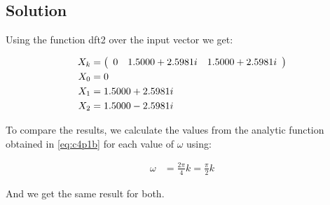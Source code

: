 \subsection*{Solution}

Using the function dft2 over the input vector we get:

\begin{equation*}
\begin{aligned}
X_k &= \left(
 \begin{array}{c c c}
 0 & 1.5000 + 2.5981i & 1.5000 + 2.5981i
 \end{array}
 \right) \\
X_0 &= 0 \\
X_1 &= 1.5000 + 2.5981i \\
X_2 &= 1.5000 - 2.5981i 
\end{aligned}
\end{equation*} 

To compare the results, we calculate the values from the analytic function obtained
in \ref{eq:c4p1b} for each value of $\omega$ using:

\begin{equation*}
\begin{aligned}
\omega &= \frac{2 \pi}{4} k = \frac{\pi}{2} k 
\end{aligned}
\end{equation*} 


And we get the same result for both.
